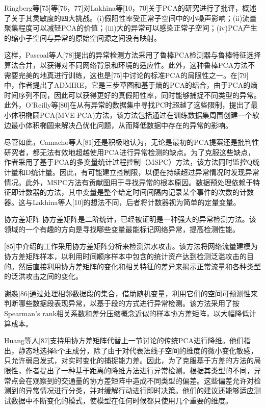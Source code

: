 Ringberg等[75]等[76，77]对Lakhina等[10，70]关于PCA的研究进行了批评，概述了关于其灵敏度的四大挑战。(i)假阳性率受正常子空间中的小噪声影响；(ii)流量聚集程度可以减轻PCA的价值；(iii)大的异常可以感染正常子空间；(iv)PCA产生的缩小子空间与异常的原始空间源之间没有映射。

这样，Pascoal等人[78]提出的异常检测方法采用了鲁棒PCA检测器与鲁棒特征选择算法合并，以获得对不同网络背景和环境的适应性。此外，这种鲁棒PCA方法不需要完美的地真进行训练，这也是[75]中讨论的标准PCA的局限性之一。在[79]中，作者提出了ADMIRE，它是三步草图和基于熵的PCA的结合，由于PCA的熵时间序列不同，因此可以获得更好的真假阳性率，同时能够捕捉不同类型的异常。此外，O'Reilly等[80]在从有异常的数据集中寻找PC时超越了这些限制，提出了最小体积椭圆PCA(MVE-PCA)方法，该方法包括通过在训练数据集周围创建一个软边最小体积椭圆来解决凸优化问题，从而降低数据中存在的异常的影响。

尽管如此，Camacho等人[81]还是积极地认为，无论是最初的PCA提案还是批判性研究者，都无法有效地超越使用PCA进行异常检测的缺点。为了克服这些缺点，作者采用了基于PCA的多变量统计过程控制（MSPC）方法，该方法同时监控Q统计量和D统计量。因此，有可能建立控制限，以便在持续超过异常情况时发现异常情况。此外，MSPC方法有贡献图用于寻找异常的根本原因。数据预处理依赖于特征即计数器的方法，其中变量是整个给定时间间隔内记录某个事件的次数的计数器。这与Lakhina等人[10]的想法不同，后者将计数器视为简单的定量变量。

协方差矩阵
协方差矩阵是二阶统计，已经被证明是一种强大的异常检测方法。该领域的一个有趣的方向是寻找哪些变量最能标记网络异常，提高检测性能。

[85]中介绍的工作采用协方差矩阵分析来检测洪水攻击。该方法将网络流量建模为协方差矩阵样本，以利用时间顺序样本中包含的统计资产达到检测泛滥攻击的目的。然后直接利用协方差矩阵的变化和相关特征的差异来揭示正常流量和各种类型的泛洪攻击之间的变化。

谢淼[86]通过处理相邻数据段的集合，借助随机变量，利用它们的空间可预测性来判断哪些数据段表现异常，以基于段的方式进行异常检测。该方法采用了按Spearman's rank相关系数和差分压缩概念近似的样本协方差矩阵，以大幅降低计算成本。

Huang等人[87]支持用协方差矩阵代替上一节讨论的传统PCA进行降维。他们指出，静态地选择k个主成分，除了由于对代表法线子空间的维度的微小变化敏感，只允许弱启发式，对实时变化的捕捉能力差。因此，为了克服基于方差的方法的局限性，作者提出了一种基于距离的降维方法进行异常检测。根据其类型的不同，异常点会在观察到的交通量的协方差矩阵中造成不同类型的偏差。这些偏差允许对检测到的异常情况进行分类，并对缓解行动进行即时决策。他们的建议还能够适应测试数据中不断变化的模式，使模型在任何时候都只使用几个重要的维度。



